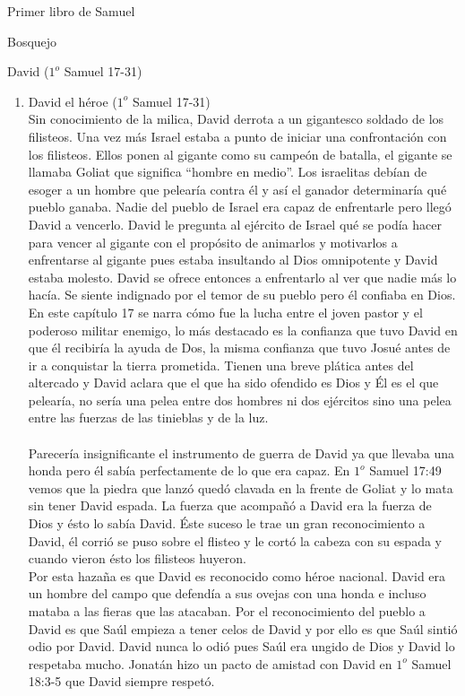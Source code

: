 \begin{section}{Primer libro de Samuel}
\begin{subsection}{Bosquejo}
\begin{subsubsection}{David ($1^{o}$ Samuel 17-31)}
\begin{enumerate}
					Saúl vivía atormentado por un espíritu ya que no tenía el Espíritu de Dios. A Saúl le envían un joven para que le tocara música para calmarlo y es ahí donde le mandan a David pues también era músico, ésto lo vemos en $1^{o}$ Samuel 16:23. Saúl le toma cariño a David sin saber que era la persona que había de quedarse con su reino, así Saúl lo hace su paje de armas.
				\item David el héroe ($1^{o}$ Samuel 17-31)\\
					Sin conocimiento de la milica, David derrota a un gigantesco soldado de los filisteos. Una vez más Israel estaba a punto de iniciar una confrontación con los filisteos. Ellos ponen al gigante como su campeón de batalla, el gigante se llamaba Goliat que significa ``hombre en medio''.
					\newpage
					Los israelitas debían de esoger a un hombre que pelearía contra él y así el ganador determinaría qué pueblo ganaba. Nadie del pueblo de Israel era capaz de enfrentarle pero llegó David a vencerlo. David le pregunta al ejército de Israel qué se podía hacer para vencer al gigante con el propósito de animarlos y motivarlos a enfrentarse al gigante pues estaba insultando al Dios omnipotente y David estaba molesto. David se ofrece entonces a enfrentarlo al ver que nadie más lo hacía. Se siente indignado por el temor de su pueblo pero él confiaba en Dios.\\
					En este capítulo 17 se narra cómo fue la lucha entre el joven pastor y el poderoso militar enemigo, lo más destacado es la confianza que tuvo David en que él recibiría la ayuda de Dos, la misma confianza que tuvo Josué antes de ir a conquistar la tierra prometida. Tienen una breve plática antes del altercado y David aclara que el que ha sido ofendido es Dios y Él es el que pelearía, no sería una pelea entre dos hombres ni dos ejércitos sino una pelea entre las fuerzas de las tinieblas y de la luz.\\ \\
					Parecería insignificante el instrumento de guerra de David ya que llevaba una honda pero él sabía perfectamente de lo que era capaz. En $1^{o}$ Samuel 17:49 vemos que la piedra que lanzó quedó clavada en la frente de Goliat y lo mata sin tener David espada. La fuerza que acompañó a David era la fuerza de Dios y ésto lo sabía David. Éste suceso le trae un gran reconocimiento a David, él corrió se puso sobre el flisteo y le cortó la cabeza con su espada y cuando vieron ésto los filisteos huyeron.\\
					Por esta hazaña es que David es reconocido como héroe nacional. David era un hombre del campo que defendía a sus ovejas con una honda e incluso mataba a las fieras que las atacaban. Por el reconocimiento del pueblo a David es que Saúl empieza a tener celos de David y por ello es que Saúl sintió odio por David. David nunca lo odió pues Saúl era ungido de Dios y David lo respetaba mucho. Jonatán hizo un pacto de amistad con David en $1^{o}$ Samuel 18:3-5 que David siempre respetó.\\ \\

\end{enumerate}
\end{subsubsection}
\end{subsection}
\end{section}
